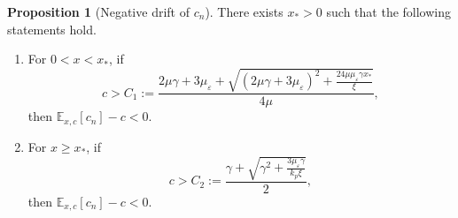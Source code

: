 \documentclass[11pt]{article}
\theoremstyle{definition}
\newtheorem{proposition}[theorem]{Proposition}
\begin{document}
\begin{proposition}[Negative drift of $c_n$]\label{Prop:drift_c}
	There exists $x_* > 0$ such that the following statements hold.
	\begin{enumerate}
		\item For $0 < x < x_*$, if 
		\begin{equation}
			c > C_1 
			:= \frac{2\mu \gamma + 3 \mu_{\varepsilon} + \sqrt{(2\mu \gamma + 3 \mu_{\varepsilon})^2 
					+ \frac{24  \mu \mu_{\varepsilon} \gamma x_*}{\xi}}}{4\mu}, \label{Eq:C1}
		\end{equation}
		then $\mathbb{E}_{x,c}[c_n] - c < 0$.
		
		\item For $x \ge x_*$, if 
		\begin{equation}
			c > C_2 
			:= \frac{\gamma + \sqrt{\gamma^2 + \frac{3 \mu_{\varepsilon} \gamma}{k_p \xi}}}{2}, \label{Eq:C2}
		\end{equation}
		then $\mathbb{E}_{x,c}[c_n] - c < 0$.
	\end{enumerate}
\end{proposition}
\end{document}
